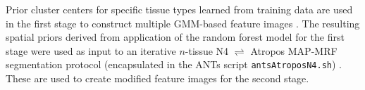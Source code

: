 \documentclass{llncs}
\begin{document}


Prior  cluster centers for specific tissue types learned from training data are used in the first stage to construct multiple GMM-based feature images \cite{avants2011}.  
The resulting spatial priors derived from application of the random
forest model for the first stage were used as input to an iterative
$n$-tissue N4 $\rightleftharpoons$ Atropos MAP-MRF segmentation protocol 
(encapsulated in the ANTs script 
\verb#antsAtroposN4.sh#) \cite{avants2011}.  These are used to 
create modified feature images for the second stage.

\end{document}
